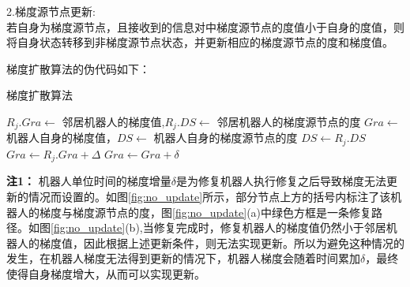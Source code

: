 2.梯度源节点更新:\\
\indent 若自身为梯度源节点，且接收到的信息对中梯度源节点的度值小于自身的度值，则将自身状态转移到非梯度源节点状态，并更新相应的梯度源节点的度和梯度值。

梯度扩散算法的伪代码如下：\\
\begin{algorithm}
	\caption{梯度扩散算法}
	\label{algorithm:gradient_diffusion}
	\begin{algorithmic}[1]
		\Require $R_j.Gra \leftarrow$ 邻居机器人的梯度值,$R_j.DS \leftarrow$  邻居机器人的梯度源节点的度
		\Ensure $Gra \leftarrow$ 机器人自身的梯度值，$DS \leftarrow$  机器人自身的梯度源节点的度
				\State $DS \gets R_j.DS$
				\State $Gra \gets R_j.Gra + \Delta$
			\Else
				\State $Gra \gets Gra + \delta$
			\EndIf		
			\State {}
		\EndFunction
	\end{algorithmic}
\end{algorithm}

\textbf{注1：} \indent 机器人单位时间的梯度增量$\delta$是为修复机器人执行修复之后导致梯度无法更新的情况而设置的。如图\ref{fig:no_update}所示，部分节点上方的括号内标注了该机器人的梯度与梯度源节点的度，图\ref{fig:no_update}(a)中绿色方框是一条修复路径。如图\ref{fig:no_update}(b),当修复完成时，修复机器人的梯度值仍然小于邻居机器人的梯度值，因此根据上述更新条件，则无法实现更新。所以为避免这种情况的发生，在机器人梯度无法得到更新的情况下，机器人梯度会随着时间累加$\delta$，最终使得自身梯度增大，从而可以实现更新。
\begin{figure*}[!htbp]
	\centering
	\hspace{1cm}
\end{figure*}

